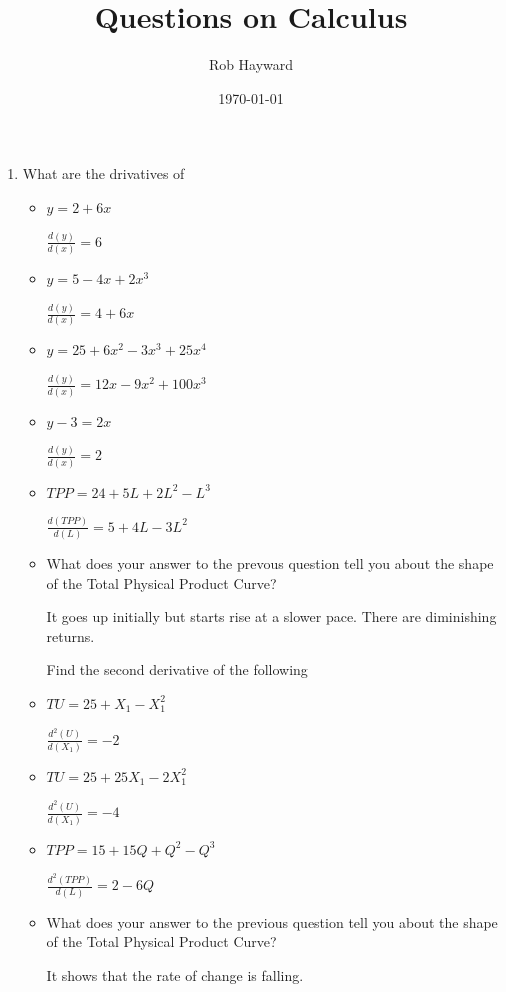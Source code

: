 \documentclass[12pt, a4paper, oneside]{article}\usepackage[]{graphicx}\usepackage[]{color}
\begin{document}
\title{Questions on Calculus}
\author{Rob Hayward} 
\date{\today}
\maketitle

\doublespacing
\begin{enumerate}


\item What are the drivatives of
\begin{itemize}
\item $y = 2 + 6x$

$\frac{d(y)}{d(x)} = 6$

\item $y = 5 - 4x +2x^3$

$\frac{d(y)}{d(x)} = 4 + 6x$

\item $y = 25 +6x^2 - 3x^3 +25x^4$

$\frac{d(y)}{d(x)} = 12x - 9x^2 + 100x^3$

\item $y - 3 = 2x$

$\frac{d(y)}{d(x)} = 2$

\item $TPP = 24 +5L +2L^2 - L^3$

$\frac{d(TPP)}{d(L)} = 5 +4L - 3L^2$

\item What does your answer to the prevous question tell you about the shape of the Total Physical Product Curve? 

It goes up initially but starts rise at a slower pace.  There are diminishing returns.  

Find the second derivative of the following

\item $TU = 25 + X_1 - X_1^2$

$\frac{d^2(U)}{d(X_1)} = -2$

\item $TU = 25 +25X_1 -2X_1^2$

$\frac{d^2(U)}{d(X_1)} = - 4$

\item $TPP = 15 +15Q +Q^2 - Q^3$

$\frac{d^2(TPP)}{d(L)} = 2 -6Q$

\item What does your answer to the previous question tell you about the shape of the Total Physical Product Curve? 

It shows that the rate of change is falling.   


\end{itemize}
\end{enumerate}
\end{document}
